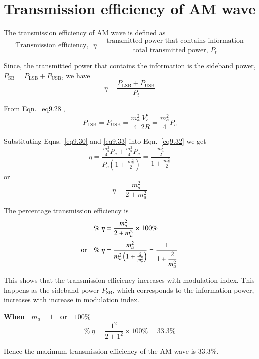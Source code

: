 \section{Transmission efficiency of AM wave}\label{sec9.13}

The transmission efficiency of AM wave is defined as
$$
\text{Transmission efficiency,~ } \eta= \dfrac{\text{transmitted power that contains information}}{\text{total transmitted power, $P_{t}$}}
$$

Since, the transmitted power that contains the information is the sideband power,\break $P_{\text{SB}}=P_{\text{LSB}}+P_{\text{USB}}$, we have
\begin{equation}
\eta = \frac{P_{\text{LSB}}+P_{\text{USB}}}{P_{t}}\label{eq9.32}
\end{equation}

From Eqn.~\eqref{eq9.28},
\begin{equation}
P_{\text{LSB}}=P_{\text{USB}}=\frac{m^{2}_{a}}{4}\frac{V^{2}_{c}}{2R}=\frac{m^{2}_{a}}{4}P_{c}\label{eq9.33}
\end{equation}

Substituting Eqns.~\eqref{eq9.30} and \eqref{eq9.33} into Eqn.~\eqref{eq9.32} we get
$$
\eta = \frac{\frac{m^{2}_{a}}{4}P_{c}+\frac{m^{2}_{a}}{4}P_{c}}{P_{c}\left(1+\frac{m^{2}_{a}}{2}\right)}=\dfrac{\frac{m^{2}_{a}}{2}}{1+\frac{m^{2}_{a}}{2}}
$$
or
\begin{equation}
\eta=\dfrac{m^{2}_{a}}{2+m^{2}_{a}}\label{eq9.34}
\end{equation}

The percentage transmission efficiency is
\begin{align}
\%\ \eta &= \frac{m^{2}_{a}}{2+m^{2}_{a}}\times 100\%\notag\\[3pt]
\text{or}\quad \% \ \eta &= \frac{m^{2}_{a}}{m^{2}_{a}\left(1+\frac{2}{m^{2}_{a}}\right)}=\dfrac{1}{1+\dfrac{2}{m^{2}_{a}}}\label{eq9.35}
\end{align}

This shows that the transmission efficiency increases with modulation index. This happens as the sideband power $P_{\text{SB}}$, which corresponds to the information power, increases with increase in modulation index.

\smallskip
\noindent
\underline{\bf When~ \boldmath$m_{a}=1$~ or~ $100\%$}
$$
\% \ \eta =\dfrac{1^{2}}{2+1^{2}}\times 100\% = 33.3\%
$$

Hence the maximum transmission efficiency of the AM wave is 33.3\%.


